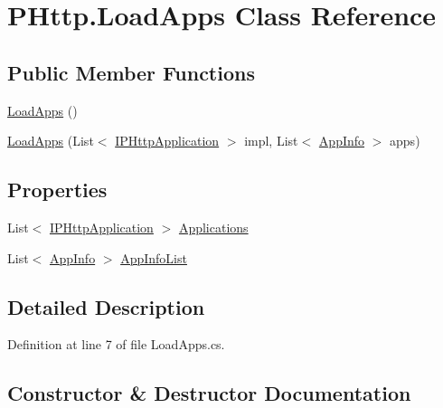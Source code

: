 \hypertarget{class_p_http_1_1_load_apps}{}\section{P\+Http.\+Load\+Apps Class Reference}
\label{class_p_http_1_1_load_apps}
\subsection*{Public Member Functions}
\begin{DoxyCompactItemize}
\item 
\hyperlink{class_p_http_1_1_load_apps_a1e8376475d91a11f7473ae8c49235e7a}{Load\+Apps} ()
\item 
\hyperlink{class_p_http_1_1_load_apps_a0043b4841c08616b2fe013b445657278}{Load\+Apps} (List$<$ \hyperlink{interface_p_http_1_1_i_p_http_application}{I\+P\+Http\+Application} $>$ impl, List$<$ \hyperlink{class_p_http_1_1_app_info}{App\+Info} $>$ apps)
\end{DoxyCompactItemize}
\subsection*{Properties}
\begin{DoxyCompactItemize}
\item 
List$<$ \hyperlink{interface_p_http_1_1_i_p_http_application}{I\+P\+Http\+Application} $>$ \hyperlink{class_p_http_1_1_load_apps_a2925a181db311314bdad41dbf0a6fce8}{Applications}
\item 
List$<$ \hyperlink{class_p_http_1_1_app_info}{App\+Info} $>$ \hyperlink{class_p_http_1_1_load_apps_af03064c830b628fe14b45d2ad2d8268e}{App\+Info\+List}
\end{DoxyCompactItemize}


\subsection{Detailed Description}


Definition at line 7 of file Load\+Apps.\+cs.



\subsection{Constructor \& Destructor Documentation}
\mbox{\label{class_p_http_1_1_load_apps_a1e8376475d91a11f7473ae8c49235e7a}} 
